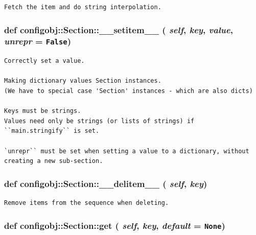 \footnotesize\begin{verbatim}Fetch the item and do string interpolation.\end{verbatim}
\normalsize
\subsubsection{\setlength{\rightskip}{0pt plus 5cm}def configobj::Section::\_\-\_\-setitem\_\-\_\- ( {\em self},  {\em key},  {\em value},  {\em unrepr} = {\tt False})}\label{classconfigobj_1_1Section_8dd4b4b239ea0130ef5ff941e501725b}




\footnotesize\begin{verbatim}
Correctly set a value.

Making dictionary values Section instances.
(We have to special case 'Section' instances - which are also dicts)

Keys must be strings.
Values need only be strings (or lists of strings) if
``main.stringify`` is set.

`unrepr`` must be set when setting a value to a dictionary, without
creating a new sub-section.
\end{verbatim}
\normalsize
\subsubsection{\setlength{\rightskip}{0pt plus 5cm}def configobj::Section::\_\-\_\-delitem\_\-\_\- ( {\em self},  {\em key})}\label{classconfigobj_1_1Section_44ee2492c48bf2cfe4997089ca1eec2a}




\footnotesize\begin{verbatim}Remove items from the sequence when deleting.\end{verbatim}
\normalsize
\subsubsection{\setlength{\rightskip}{0pt plus 5cm}def configobj::Section::get ( {\em self},  {\em key},  {\em default} = {\tt None})}\label{classconfigobj_1_1Section_1a3d744335ce32ea9f647f5c5ae160e8}




